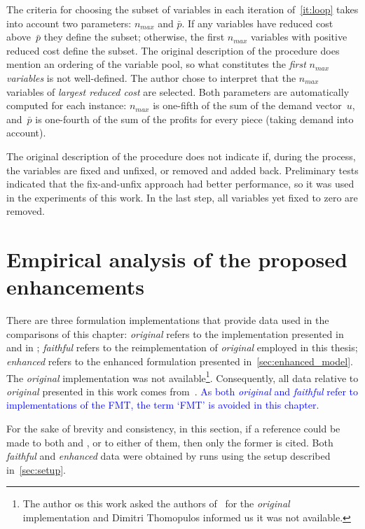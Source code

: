 \documentclass[ppgc,tese,english,formais,babel]{iiufrgs}
\newif\iffinalversion
\newcommand{\newtext}[1]{\iffinalversion%
#1%
\else%
\textcolor{blue}{#1}%
\fi%
}
\begin{document}
The criteria for choosing the subset of variables in each iteration of~\autoref{it:loop} takes into account two parameters: \(n_{max}\) and \(\bar{p}\). If any variables have reduced cost above~\(\bar{p}\) they define the subset; otherwise, the first \(n_{max}\) variables with positive reduced cost define the subset. The original description of the procedure does mention an ordering of the variable pool, so what constitutes the \emph{first} \(n_{max}\) \emph{variables} is not well-defined. The author chose to interpret that the \(n_{max}\) variables of \emph{largest reduced cost} are selected. Both parameters are automatically computed for each instance: \(n_{max}\) is one-fifth of the sum of the demand vector~\(u\), and~\(\bar{p}\) is one-fourth of the sum of the profits for every piece (taking demand into account).

The original description of the procedure does not indicate if, during the process, the variables are fixed and unfixed, or removed and added back.
Preliminary tests indicated that the fix-and-unfix approach had better performance, so it was used in the experiments of this work.
In the last step, all variables yet fixed to zero are removed.

\chapter{Empirical analysis of the proposed enhancements}
\label{sec:experimental_results}
\label{sec:furini_vs_enhanced_comparison}

There are three formulation implementations that provide data used in the comparisons of this chapter:
\emph{original} refers to the implementation presented in~\citet{furini:2016} and in \citet{dimitri_thesis};
\emph{faithful} refers to the reimplementation of \emph{original} employed in this thesis;
\emph{enhanced} refers to the enhanced formulation presented in~\cref{sec:enhanced_model}.
The \emph{original} implementation was not available\footnote{
	The author os this work asked the authors of~\citet{furini:2016} for the \emph{original} implementation and Dimitri Thomopulos informed us it was not available.
}.
Consequently, all data relative to \emph{original} presented in this work comes from~\citet{dimitri_thesis}.
\newtext{As both \emph{original} and \emph{faithful} refer to implementations of the FMT, the term `FMT' is avoided in this chapter.}
For the sake of brevity and consistency, in this section, if a reference could be made to both \citet{dimitri_thesis} and \citet{furini:2016}, or to either of them, then only the former is cited.
Both \emph{faithful} and \emph{enhanced} data were obtained by runs using the setup described in~\cref{sec:setup}.
\end{document}
